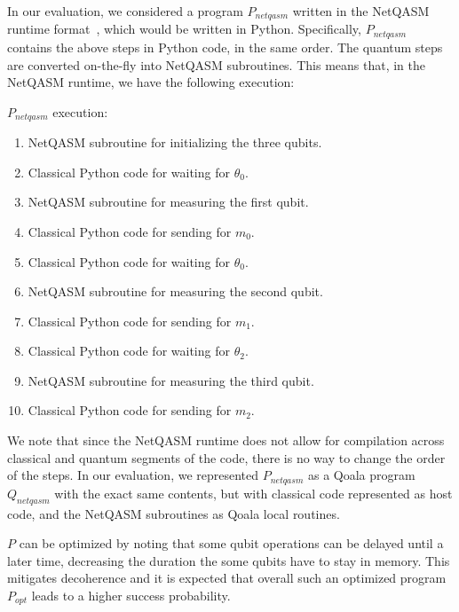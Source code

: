 In our evaluation, we considered a program $P_{netqasm}$ written in the NetQASM runtime format~\cite{dahlberg2022netqasm}, which would be written in Python.
Specifically, $P_{netqasm}$ contains the above steps in Python code, in the same order.
The quantum steps are converted on-the-fly into NetQASM subroutines.
This means that, in the NetQASM runtime, we have the following execution:

$P_{netqasm}$ execution:
\begin{enumerate}
  \item NetQASM subroutine for initializing the three qubits.
  \item Classical Python code for waiting for $\theta_0$.
  \item NetQASM subroutine for measuring the first qubit.
  \item Classical Python code for sending for $m_0$.
  \item Classical Python code for waiting for $\theta_0$.
  \item NetQASM subroutine for measuring the second qubit.
  \item Classical Python code for sending for $m_1$.
  \item Classical Python code for waiting for $\theta_2$.
  \item NetQASM subroutine for measuring the third qubit.
  \item Classical Python code for sending for $m_2$.
\end{enumerate}

We note that since the NetQASM runtime does not allow for compilation across classical and quantum segments of the code,
there is no way to change the order of the steps.
In our evaluation, we represented $P_{netqasm}$ as a Qoala program $Q_{netqasm}$ with the exact same contents, but with classical code represented as host code, and the NetQASM subroutines as Qoala local routines.

$P$ can be optimized by noting that some qubit operations can be delayed until a later time, decreasing the duration the some qubits have to stay in memory.
This mitigates decoherence and it is expected that overall such an optimized program $P_{opt}$ leads to a higher success probability.


